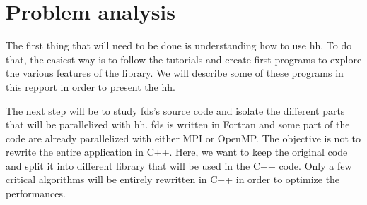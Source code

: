 
\section{Problem analysis}

The first thing that will need to be done is understanding how to use \gls{hh}.
To do that, the easiest way is to follow the tutorials and create first programs
to explore the various features of the library. We will describe some of these
programs in this repport in order to present the \gls{hh}.

The next step will be to study \gls{fds}'s source code and isolate the
different parts that will be parallelized with \gls{hh}. \gls{fds} is written in
Fortran and some part of the code are already parallelized with either MPI or
OpenMP. The objective is not to rewrite the entire application in C++. Here, we
want to keep the original code and split it into different library that will be
used in the C++ code. Only a few critical algorithms will be entirely rewritten
in C++ in order to optimize the performances.
